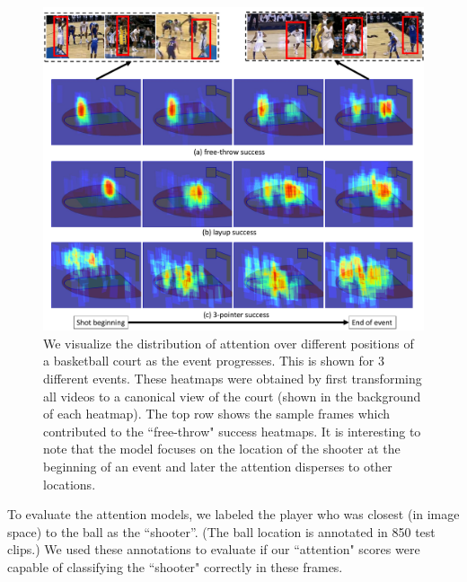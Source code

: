 \begin{figure}[t!]
\begin{center}
  \vspace{-7mm}
  \includegraphics[width=0.9\linewidth]{images/heatmap_figure_v2_cropped.pdf}
\end{center}
  \vspace{-4mm}
   \caption{We visualize the distribution of attention over different positions of
   a basketball court as the event progresses. This is shown for 3 different events.
   These heatmaps were obtained by first transforming all videos
 to a canonical view of the court (shown in the background of each heatmap). The top row shows
 the sample frames which contributed to the ``free-throw" success heatmaps. It is interesting
 to note that the model focuses on the location of the shooter at the beginning of an
 event and later the attention disperses to other locations.}
  \vspace{-4mm}
\label{fig:att_heatmap}
\end{figure}

To evaluate the attention models, we  labeled the player who was
closest (in image space) to the ball as the ``shooter''.
(The ball location is annotated in 850 test clips.)
We used these annotations to evaluate if our ``attention" scores
were capable of classifying the ``shooter" correctly in these frames.

